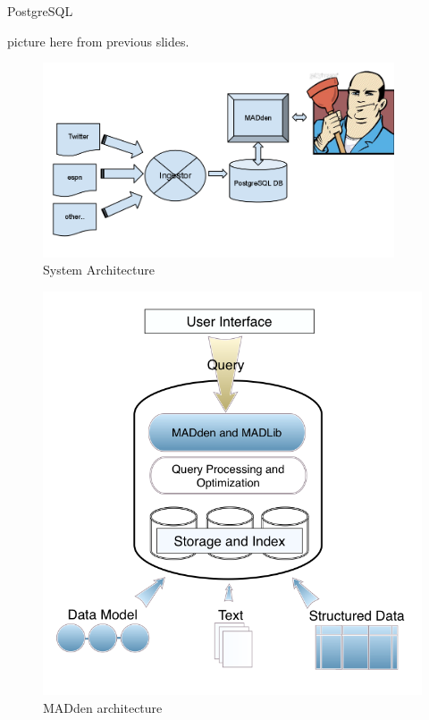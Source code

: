 \documentclass{article}
\newcommand{\system}{MADden\xspace}
\begin{document}
\begin{enumerate}
\begin{enumerate}
\begin{enumerate}
      PostgreSQL

      picture here from previous slides.



      \begin{figure}
        \begin{center}
          \includegraphics[width=104mm]{architecture-1.png}
          \caption{System Architecture}
          \label{fig:architecture}
        \end{center}
      \end{figure}

      \begin{figure}
        \begin{center}
          \includegraphics[scale=0.4]{arch.png}
          \caption{{\system} architecture}
          \label{fig:arch}
        \end{center}
      \end{figure}


\end{enumerate}
\end{enumerate}
\end{enumerate}
\end{document}

